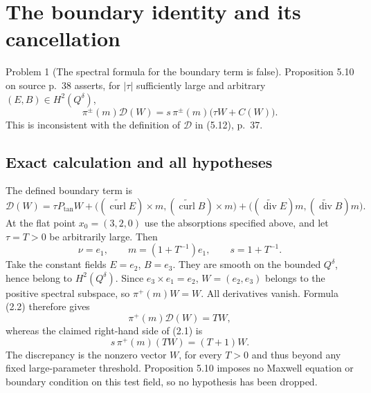 \documentclass[10pt]{article}
\begin{document}
\section*{The boundary identity and its cancellation}
Problem 1 (The spectral formula for the boundary term is false).  Proposition 5.10 on source p. 38 asserts, for \(|\tau|\) sufficiently large and arbitrary \((E,B)\in H^2(Q^\delta)\), \[\pi^\pm(m)\mathcal D(W)=s\,\pi^\pm(m)\bigl(\tau W+C(W)\bigr).
 \tag{2.1}\] This is inconsistent with the definition of \(\mathcal D\) in (5.12), p. 37.\par
\subsection*{Exact calculation and all hypotheses}
The defined boundary term is \[\mathcal D(W)=\tau P_{\mathrm{tan}}W+
   \bigl((\widetilde{\operatorname{curl}}E)\times m,(\widetilde{\operatorname{curl}}B)\times m\bigr)
   +\bigl((\widetilde{\operatorname{div}}E)m,(\widetilde{\operatorname{div}}B)m\bigr).
 \tag{2.2}\] At the flat point \(x_0=(3,2,0)\) use the absorptions specified above, and let \(\tau=T>0\) be arbitrarily large. Then \[\nu=e_1,\qquad m=(1+T^{-1})e_1,\qquad s=1+T^{-1}.\] Take the constant fields \(E=e_2\), \(B=e_3\). They are smooth on the bounded \(Q^\delta\), hence belong to \(H^2(Q^\delta)\). Since \(e_3\times e_1=e_2\), \(W=(e_2,e_3)\) belongs to the positive spectral subspace, so \(\pi^+(m)W=W\). All derivatives vanish. Formula (2.2) therefore gives \[\pi^+(m)\mathcal D(W)=TW,\] whereas the claimed right-hand side of (2.1) is \[s\,\pi^+(m)(TW)=(T+1)W.
 \tag{2.3}\] The discrepancy is the nonzero vector \(W\), for every \(T>0\) and thus beyond any fixed large-parameter threshold. Proposition 5.10 imposes no Maxwell equation or boundary condition on this test field, so no hypothesis has been dropped.\par
\end{document}
